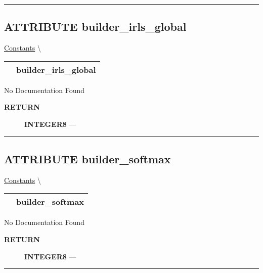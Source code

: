 \rule{\linewidth}{0.5pt}
\subsection*{\textsf{\colorbox{headtoc}{\color{white} ATTRIBUTE}
builder\_irls\_global}}

\hypertarget{ecldoc:constants.builder_irls_global}{}
\hspace{0pt} \hyperlink{ecldoc:Constants}{Constants} \textbackslash 

{\renewcommand{\arraystretch}{1.5}
\begin{tabularx}{\textwidth}{|>{\raggedright\arraybackslash}l|X|}
\hline
\hspace{0pt}\mytexttt{\color{red} } & \textbf{builder\_irls\_global} \\
\hline
\end{tabularx}
}

\par





No Documentation Found








\par
\begin{description}
\item [\colorbox{tagtype}{\color{white} \textbf{\textsf{RETURN}}}] \textbf{INTEGER8} --- 
\end{description}




\rule{\linewidth}{0.5pt}
\subsection*{\textsf{\colorbox{headtoc}{\color{white} ATTRIBUTE}
builder\_softmax}}

\hypertarget{ecldoc:constants.builder_softmax}{}
\hspace{0pt} \hyperlink{ecldoc:Constants}{Constants} \textbackslash 

{\renewcommand{\arraystretch}{1.5}
\begin{tabularx}{\textwidth}{|>{\raggedright\arraybackslash}l|X|}
\hline
\hspace{0pt}\mytexttt{\color{red} } & \textbf{builder\_softmax} \\
\hline
\end{tabularx}
}

\par





No Documentation Found








\par
\begin{description}
\item [\colorbox{tagtype}{\color{white} \textbf{\textsf{RETURN}}}] \textbf{INTEGER8} --- 
\end{description}




\rule{\linewidth}{0.5pt}


